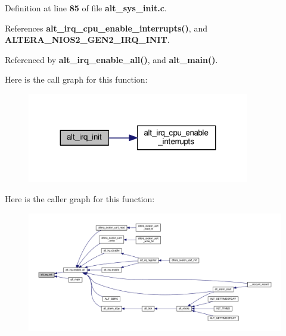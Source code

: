 Definition at line {\bf 85} of file {\bf alt\+\_\+sys\+\_\+init.\+c}.



References {\bf alt\+\_\+irq\+\_\+cpu\+\_\+enable\+\_\+interrupts()}, and {\bf A\+L\+T\+E\+R\+A\+\_\+\+N\+I\+O\+S2\+\_\+\+G\+E\+N2\+\_\+\+I\+R\+Q\+\_\+\+I\+N\+IT}.



Referenced by {\bf alt\+\_\+irq\+\_\+enable\+\_\+all()}, and {\bf alt\+\_\+main()}.



Here is the call graph for this function\+:
\nopagebreak
\begin{figure}[H]
\begin{center}
\leavevmode
\includegraphics[width=275pt]{dd/d99/alt__sys__init_8c_adc592f32c3a0ef8eccfc3b4ff6e3afba_cgraph}
\end{center}
\end{figure}




Here is the caller graph for this function\+:
\nopagebreak
\begin{figure}[H]
\begin{center}
\leavevmode
\includegraphics[width=350pt]{dd/d99/alt__sys__init_8c_adc592f32c3a0ef8eccfc3b4ff6e3afba_icgraph}
\end{center}
\end{figure}


